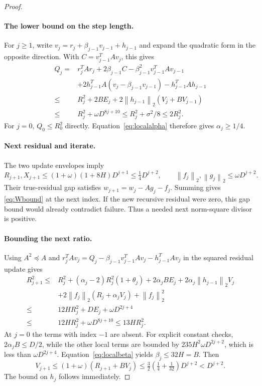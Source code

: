 \documentclass[11pt]{article}
\theoremstyle{remark}\newtheorem{remark}[theorem]{Remark}
\newcommand{\norm}[1]{\left\lVert#1\right\rVert_2}
\begin{document}
\begin{proof}
\paragraph{The lower bound on the step length.}
For $j\ge1$, write $v_j=r_j+\beta_{j-1}v_{j-1}+h_{j-1}$ and expand the
quadratic form in the opposite direction. With
$C=v_{j-1}^TAv_j$, this gives
\begin{align*}
Q_j={}&r_j^TAr_j+2\beta_{j-1}C-
\beta_{j-1}^2v_{j-1}^TAv_{j-1}\\
&+2h_{j-1}^TA(v_j-\beta_{j-1}v_{j-1})-h_{j-1}^TAh_{j-1}\\
\le{}&R_j^2+2BE_j+
2\norm{h_{j-1}}(V_j+B V_{j-1})\\
\le{}&R_j^2+\omega D^{8j+10}
\le R_j^2+\sigma^2/8\le2R_j^2.
\end{align*}
For $j=0$, $Q_0\le R_0^2$ directly. Equation~\eqref{eq:localalpha}
therefore gives $\alpha_j\ge1/4$.

\paragraph{Next residual and iterate.}
The two update envelopes imply
\[
R_{j+1},X_{j+1}\le(1+\omega)(1+8H)D^{j+1}
\le\tfrac14D^{j+2},\qquad
\norm{f_j},\norm{g_j}\le\omega D^{j+2}.
\]
Their true-residual gap satisfies $w_{j+1}=w_j-Ag_j-f_j$.
Summing gives \eqref{eq:Wbound} at the next index. If the new recursive
residual were zero, this gap bound would already contradict failure.
Thus a needed next norm-square divisor is positive.

\paragraph{Bounding the next ratio.}
Using $A^2\preceq A$ and
$r_j^TAv_j=Q_j-\beta_{j-1}v_{j-1}^TAv_j-h_{j-1}^TAv_j$ in the
squared residual update gives
\begin{align*}
R_{j+1}^2\le{}&R_j^2+(\alpha_j-2)R_j^2(1+\theta_j)
+2\alpha_jB E_j+2\alpha_j\norm{h_{j-1}}V_j\\
&+2\norm{f_j}(R_j+\alpha_jV_j)+\norm{f_j}^2\\
\le{}&12H R_j^2+D E_j+\omega D^{2j+4}\\
\le{}&12H R_j^2+\omega D^{8j+10}\le13H R_j^2.
\end{align*}
At $j=0$ the terms with index $-1$ are absent. For explicit constant
checks, $2\alpha_jB\le D/2$, while the other local terms are bounded by
$235H^2\omega D^{2j+2}$, which is less than
$\omega D^{2j+4}$. Equation~\eqref{eq:localbeta} yields
$\beta_j\le32H=B$. Then
\[
V_{j+1}\le(1+\omega)(R_{j+1}+B V_j)
\le\tfrac32(\tfrac14+\tfrac1{32})D^{j+2}<D^{j+2}.
\]
The bound on $h_j$ follows immediately.


\end{proof}
\end{document}
